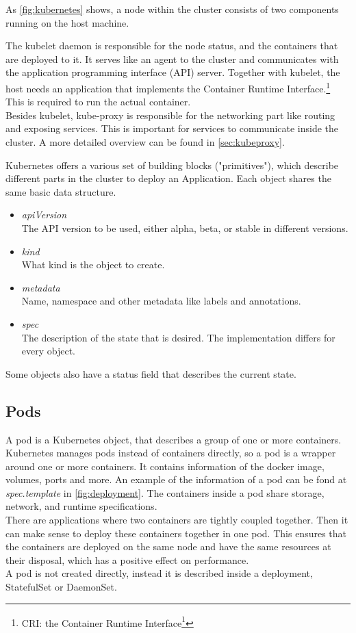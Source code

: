 As \autoref{fig:kubernetes} shows, a node within the cluster consists of two components running on the host machine.

The kubelet daemon is responsible for the node status, and the containers that are deployed to it.
It serves like an agent to the cluster and communicates with the application programming interface (API) server.
Together with kubelet, the host needs an application that implements the Container Runtime Interface.\footnote{CRI: the Container Runtime Interface\footcite{CRI}}
This is required to run the actual container.
\\
Besides kubelet, kube-proxy is responsible for the networking part like routing and exposing services.
This is important for services to communicate inside the cluster.
A more detailed overview can be found in \autoref{sec:kubeproxy}.\cite{KUBERNETES-COMPONENTS}
\\
\newpage

Kubernetes offers a various set of building blocks ("primitives"), which describe different parts in the cluster to deploy an Application.
Each object shares the same basic data structure.

\begin{itemize}
    \item \textit{apiVersion} \\
    The API version to be used, either alpha, beta, or stable in different versions.
    \item \textit{kind} \\
    What kind is the object to create.
    \item \textit{metadata} \\
    Name, namespace and other metadata like labels and annotations.
    \item \textit{spec} \\
    The description of the state that is desired.
    The implementation differs for every object.
\end{itemize}

Some objects also have a status field that describes the current state.~\cite{KUBERNETES-OBJECTS}

\subsection{Pods}
A pod is a Kubernetes object, that describes a group of one or more containers.
Kubernetes manages pods instead of containers directly, so a pod is a wrapper around one or more containers.
It contains information of the docker image, volumes, ports and more.
An example of the information of a pod can be fond at \textit{spec.template} in \autoref{fig:deployment}.
The containers inside a pod share storage, network, and runtime specifications.
\\
There are applications where two containers are tightly coupled together.
Then it can make sense to deploy these containers together in one pod.
This ensures that the containers are deployed on the same node and have the same resources at their disposal, which has a positive effect on performance.
\\
A pod is not created directly, instead it is described inside a deployment, StatefulSet or DaemonSet.~\cite{KUBERNETES-POD}

